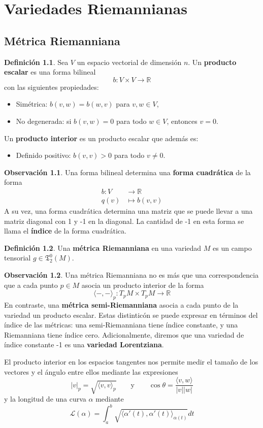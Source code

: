 \documentclass[spanish]{book}
\theoremstyle{definition}
\newtheorem*{defn}{Definición}
\newtheorem*{obs}{Observación}
\newcommand{\R}{\mathbb{R}}
\newcommand{\T}{\mathfrak{T}}
\begin{document}
	\chapter{Variedades Riemannianas}
	\section{Métrica Riemanniana}
	\begin{defn}
		Sea $V$ un espacio vectorial de dimensión $n$. Un \textbf{producto escalar} es una forma bilineal
			\[b:V\times V\to\R\]
		con las siguientes propiedades:
		\begin{itemize}
			\item Simétrica: $b(v,w)=b(w,v)$ para $v,w\in V$,
			\item No degenerada: si $b(v,w)=0$ para todo $w\in V$, entonces $v=0$.
		\end{itemize}
		Un \textbf{producto interior} es un producto escalar que además es:
		\begin{itemize}
			\item Definido positivo: $b(v,v)>0$ para todo $v\neq0$.
		\end{itemize}
	\end{defn}
	\begin{obs}
		Una forma bilineal determina una \textbf{forma cuadrática} de la forma
		\begin{align*}
			b:V&\to\R\\
			q(v)&\mapsto b(v,v)
		\end{align*}
		A su vez, una forma cuadrática determina una matriz que se puede llevar a una matriz diagonal con 1 y -1 en la diagonal. La cantidad de -1 en esta forma se llama el \textbf{índice} de la forma cuadrática.
	\end{obs}
	
	\begin{defn}
		Una \textbf{métrica Riemanniana} en una variedad $M$ es un campo tensorial $g\in\T^0_2(M)$.
	\end{defn}
	\begin{obs}
		Una métrica Riemanniana no es más que una correspondencia que a cada punto $p\in M$ asocia un producto interior de la forma
			\[\langle -,- \rangle_p:T_pM\times T_pM\to\R\]
		 En contraste, una \textbf{métrica semi-Riemanniana} asocia a cada punto de la variedad un producto escalar. Estas distinticón se puede expresar en términos del índice de las métricas: una semi-Riemanniana tiene índice constante, y una Riemanniana tiene índice cero. Adicionalmente, diremos que una variedad de índice constante -1 es una \textbf{variedad Lorentziana}.
	\end{obs}
	El producto interior en los espacios tangentes nos permite medir el tamaño de los vectores y el ángulo entre ellos mediante las expresiones
	\[|v|_p=\sqrt{\langle v,v\rangle_p}\qquad\text{y}\qquad\cos\theta=\frac{\langle v,w\rangle}{|v||w|}\]
	y la longitud de una curva $\alpha$ mediante
	\[\mathcal{L}(\alpha)=\int_a^b\sqrt{\langle\alpha'(t),\alpha'(t)\rangle_{\alpha(t)}}dt\]
	
\end{document}
